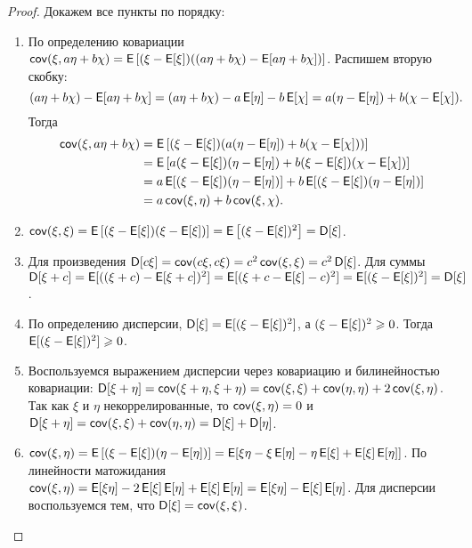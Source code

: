 \begin{proof}
    Докажем все пункты по порядку:
    \begin{enumerate}
        \item По определению ковариации \(\cov(\xi, a\eta + b\chi) = \E\left[(\xi - \E[\xi])((a\eta + b\chi)-\E[a\eta + b\chi])\right]\). Распишем вторую скобку: \[(a\eta + b\chi)-\E[a\eta + b\chi] = (a\eta + b\chi) - a\E[\eta] - b\E[\chi] = a(\eta - \E[\eta]) + b(\chi - \E[\chi]).\] Тогда
        \[\begin{aligned}
        \cov(\xi, a\eta + b\chi) &= \E\left[(\xi - \E[\xi])(a(\eta - \E[\eta]) + b(\chi - \E[\chi]))\right] \\
        &= \E\left[a(\xi - \E[\xi])(\eta - \E[\eta]) + b(\xi - \E[\xi])(\chi - \E[\chi])\right] \\
        &= a\E[(\xi - \E[\xi])(\eta - \E[\eta])] + b\E[(\xi - \E[\xi])(\eta - \E[\eta])] \\
        &= a\cov(\xi, \eta) + b\cov(\xi, \chi).
        \end{aligned}\]
        
        \item \(\cov(\xi, \xi) = \E\left[(\xi - \E[\xi])(\xi - \E[\xi])\right] = \E\left[(\xi - \E[\xi])^2\right] = \D[\xi]\).
        
        \item Для произведения \(\D[c\xi] = \cov(c\xi, c\xi) = c^2\cov(\xi, \xi) = c^2\D[\xi]\). Для суммы \(\D[\xi + c] = \E[((\xi + c) - \E[\xi + c])^2] = \E[(\xi + c - \E[\xi] - c)^2] = \E[(\xi - \E[\xi])^2] = \D[\xi]\).
        
        \item По определению дисперсии, \(\D[\xi] = \E[(\xi-\E[\xi])^2]\), а \((\xi-\E[\xi])^2 \geq 0\). Тогда \(\E[(\xi-\E[\xi])^2] \geq 0\).
        
        \item Воспользуемся выражением дисперсии через ковариацию и билинейностью ковариации:
        \(\D[\xi + \eta] = \cov(\xi + \eta, \xi + \eta) = \cov(\xi, \xi) + \cov(\eta, \eta) + 2\cov(\xi, \eta)\). Так как \(\xi\) и \(\eta\) некоррелированные, то \(\operatorname{\mathsf{cov}}(\xi, \eta) = 0\) и \(\D[\xi + \eta] = \cov(\xi, \xi) + \cov(\eta, \eta) = \D[\xi] + \D[\eta]\).
        
        \item \(\cov(\xi, \eta) = \E\left[(\xi - \E[\xi])(\eta-\E[\eta])\right] = \E[\xi\eta - \xi\E[\eta] - \eta\E[\xi] + \E[\xi]\E[\eta]]\). По линейности матожидания \(\cov(\xi, \eta) = \E[\xi\eta] - 2\E[\xi]\E[\eta] + \E[\xi]\E[\eta] = \E[\xi\eta] - \E[\xi]\E[\eta]\). Для дисперсии воспользуемся тем, что \(\D[\xi] = \cov(\xi, \xi)\).
    \end{enumerate}
\end{proof}
